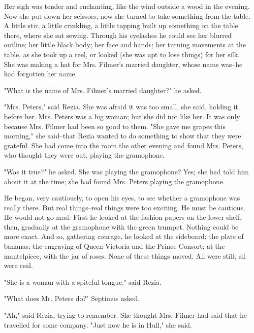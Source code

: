 \documentclass[lang=cn,10pt]{elegantbook}
\begin{document}
Her sigh was tender and enchanting, like the wind outside a wood in
the evening.  Now she put down her scissors; now she turned to take
something from the table.  A little stir, a little crinkling, a
little tapping built up something on the table there, where she sat
sewing.  Through his eyelashes he could see her blurred outline;
her little black body; her face and hands; her turning movements at
the table, as she took up a reel, or looked (she was apt to lose
things) for her silk.  She was making a hat for Mrs. Filmer's
married daughter, whose name was--he had forgotten her name.

"What is the name of Mrs. Filmer's married daughter?" he asked.

"Mrs. Peters," said Rezia.  She was afraid it was too small, she
said, holding it before her.  Mrs. Peters was a big woman; but she
did not like her.  It was only because Mrs. Filmer had been so good
to them.  "She gave me grapes this morning," she said--that Rezia
wanted to do something to show that they were grateful.  She had
come into the room the other evening and found Mrs. Peters, who
thought they were out, playing the gramophone.

"Was it true?" he asked.  She was playing the gramophone?  Yes; she
had told him about it at the time; she had found Mrs. Peters
playing the gramophone.

He began, very cautiously, to open his eyes, to see whether a
gramophone was really there.  But real things--real things were too
exciting.  He must be cautious.  He would not go mad.  First he
looked at the fashion papers on the lower shelf, then, gradually at
the gramophone with the green trumpet.  Nothing could be more
exact.  And so, gathering courage, he looked at the sideboard; the
plate of bananas; the engraving of Queen Victoria and the Prince
Consort; at the mantelpiece, with the jar of roses.  None of these
things moved.  All were still; all were real.

"She is a woman with a spiteful tongue," said Rezia.

"What does Mr. Peters do?" Septimus asked.

"Ah," said Rezia, trying to remember.  She thought Mrs. Filmer had
said that he travelled for some company.  "Just now he is in Hull,"
she said.
\end{document}
